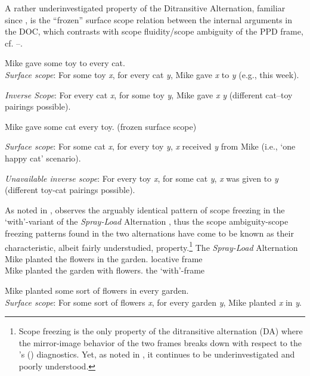 \documentclass[output=paper,colorlinks,citecolor=brown]{langscibook}
\begin{document}
\noindent A rather underinvestigated property of the Ditransitive Alternation, familiar since \citet{Larson1990}, is the “frozen” surface scope relation between the internal arguments in the DOC, which contrasts with scope fluidity/scope ambiguity of the PPD frame, cf. --.

\ea%
    \label{ex:antonyuk:3}

\ea \label{ex:antonyuk:3a}    Mike gave some toy to every cat.        \\
\textit{Surface scope}: For some toy \textit{x}, for every cat \textit{y}, Mike gave \textit{x} to \textit{y }(e.g., this week).

\textit{Inverse Scope}: For every cat \textit{x}, for some toy \textit{y}, Mike gave  \textit{x} \textit{y} (different cat--toy pairings possible).

\ex \label{ex:antonyuk:3b}  Mike gave some cat every toy.        \hfill (frozen surface scope)

\textit{Surface scope}: For some cat\textit{ x}, for every toy \textit{y}, \textit{x} received \textit{y} from Mike (i.e., ‘one happy cat’ scenario).

\textit{Unavailable inverse scope}: For every toy \textit{x}, for some cat \textit{y}, \textit{x} was given to \textit{y} (different toy-cat pairings possible).
    \z
\z

\noindent As noted in \citet{Larson1990}, \citet{Schneider-Zioga1988} observes the arguably identical pattern of scope freezing in the `with'{}-variant of the \textit{Spray-Load} Alternation , thus the scope ambiguity-scope freezing patterns found in the two alternations have come to be known as their characteristic, albeit fairly understudied, property.\footnote{\textrm{Scope freezing is the only property of the ditransitive alternation (DA) where the mirror-image behavior of the two frames breaks down with respect to the \citeauthor{BarssLasnik1986}'s (\citeyear{BarssLasnik1986}) diagnostics. Yet, as noted in \citet{HarleyMiyagawa2017}, it continues to be underinvestigated and poorly understood.}}
\ea%
    \label{ex:antonyuk:4}
    The \textit{Spray-Load} Alternation
    \ea    Mike planted the flowers in the garden.       \hfill locative frame\\
    \ex Mike planted the garden with flowers.       \hfill the `with'-frame
\z
\z

\ea%
    \label{ex:antonyuk:5}
\ea   Mike planted some sort of flowers in every garden.  \\
\textit{Surface scope}: For some sort of flowers \textit{x}, for every garden \textit{y}, Mike planted \textit{x} in \textit{y}.
\end{document}
